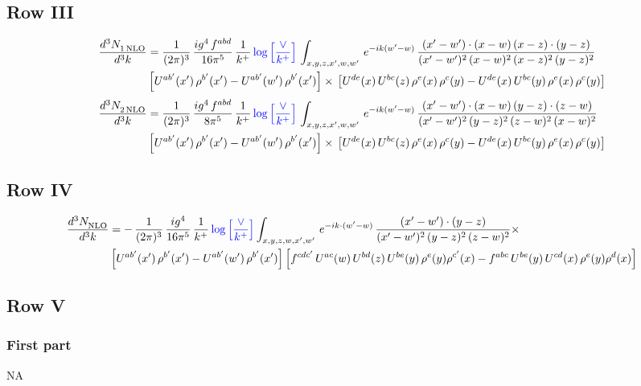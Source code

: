 \documentclass[9pt]{article}
\numberwithin{equation}{section}
\begin{document}
\subsection{Row III}
\begin{align}
   \frac{d^{3}N_{1\,\rm NLO}^{\rm}}{d^{3}k}  & = \frac{1}{(2\pi)^{3}}\,\frac{ig^{4}\,f^{abd}}{16\pi^{5}}\,\frac{1}{k^{+}}\,{\color{blue}\log{\left[\frac{\vee}{k^{+}}\right]}}\,\int_{x,y,z,x',w,w'}\, e^{-ik(w^\prime-w)}\, \frac{(x'-w')\cdot (x-w)\, (x-z)\cdot (y-z)}{(x'-w')^{2}\, (x-w)^{2}\, (x-z)^{2}\, (y-z)^{2}}\, \notag \\ & \left[U^{ab'}(x')\,\rho^{b'}(x')-U^{ab'}(w')\, \rho^{b'}(x')\right]\times\, \left[U^{de}(x)\,U^{bc}(z)\, \rho^{e}(x)\,\rho^{c}(y)-U^{de}(x)\,U^{bc}(y)\,\rho^{e}(x)\,\rho^{c}(y)\right]
\end{align}
\begin{align}
   \frac{d^{3}N_{2\,\rm NLO}^{\rm}}{d^{3}k}  & = \frac{1}{(2\pi)^{3}} \,\frac{ig^{4}\, f^{abd}}{8\pi^{5}}\, \frac{1}{k^{+}}\, {\color{blue}\log{\left[\frac{\vee}{ k^{+}}\right]}}\,\int_{x,y,z,x',w,w'}\,e^{-ik(w^\prime-w)}\,\frac{(x'-w')\cdot (x-w)\, (y-z)\cdot (z-w)}{(x'-w')^{2}\, (y-z)^{2}\, (z-w)^{2}\,(x-w)^{2}}\, \notag \\ & \left[U^{ab'}(x')\,\rho^{b'}(x')-U^{ab'}(w')\, \rho^{b'}(x')\right]\times\,\left[U^{de}(x)\,U^{bc}(z)\, \rho^{e}(x)\,\rho^{c}(y)-U^{de}(x)\,U^{bc}(y)\,\rho^{e}(x)\,\rho^{c}(y)\right]
\end{align}   
\subsection{Row IV}
\begin{align}
    \frac{d^{3}N_{\rm NLO}^{\rm}}{d^{3}k}  & =  -\,\frac{1}{(2\pi)^{3}}\,\frac{ig^{4}}{16\pi^{5}}\,\frac{1}{k^{+}}\,{\color{blue}\log{\left[\frac{\vee}{k^{+}}\right]}}\int_{x,y,z,w,x',w'}\,e^{-ik\cdot (w^\prime-w)}\,\frac{(x'-w')\cdot (y-z)}{(x'-w')^{2}\,(y-z)^{2}\,(z-w)^{2}}\times\notag \\ &  \left[U^{ab'}(x')\,\rho^{b'}(x')-U^{ab'}(w')\,\rho^{b'}(x')\right] \left[f^{cdc'}\,U^{ac}(w)\,U^{bd}(z)\,U^{be}(y)\,\rho^{e}(y)\rho^{c'}(x)-f^{abc}\,U^{be}(y)\,U^{cd}(x)\,\rho^{e}(y)\rho^{d}(x)\right]
\end{align}
\subsection{Row V}
\subsubsection*{First part}
\textsc{NA}
\end{document}
